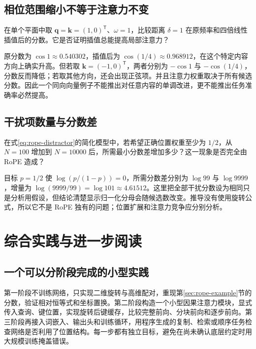 \documentclass[UTF8,12pt,a4paper,fontset=fandol]{ctexart}
\begin{document}
\subsection{相位范围缩小不等于注意力不变}
\begin{example}[插值对短距离的影响]
在单个平面中取 $\mathbf q=\mathbf k=(1,0)^{\mathsf T}$、$\omega=1$，比较距离 $\delta=1$ 在原频率和四倍线性插值后的分数。它是否证明插值总能提高局部注意力？
\end{example}
\begin{solve}
原分数为 $\cos1\approx0.540302$，插值后为 $\cos(1/4)\approx0.968912$，在这个特定内容方向上确实升高。但若取 $\mathbf k=(-1,0)^{\mathsf T}$，两者分别为 $-\cos1$ 与 $-\cos(1/4)$，分数反而降低；若取其他方向，还会出现正弦项。并且注意力权重取决于所有候选分数。因此一个同向向量例子不能推出对任意内容的单调改进，更不能推出任务准确率必然提高。
\end{solve}

\subsection{干扰项数量与分数差}
\begin{example}[扩窗后的权重稀释]
在式\eqref{eq:rope-distractor}的简化模型中，若希望正确位置权重至少为 $1/2$，从 $N=100$ 增加到 $N=10000$ 后，所需最小分数差增加多少？这一现象是否完全由 RoPE 造成？
\end{example}
\begin{solve}
目标 $p=1/2$ 使 $\log(p/(1-p))=0$，所需分数差分别为 $\log99$ 与 $\log9999$，增量为 $\log(9999/99)=\log101\approx4.61512$。这里把全部干扰分数设为相同只是分析用假设，但结论清楚显示归一化分母会随候选数改变。推导没有使用旋转公式，所以它不是 RoPE 独有的问题；位置扩展和注意力竞争应分别分析。
\end{solve}

\section{综合实践与进一步阅读}
\label{sec:rope-practice}

\subsection{一个可以分阶段完成的小型实践}
第一阶段不训练网络，只实现二维旋转与高维配对，重现第\ref{sec:rope-example}节的分数，验证相对恒等式和坐标置换。第二阶段构造一个小型因果注意力模块，显式传入查询、键位置，实现旋转后键缓存，比较完整前向、分块前向和逐步前向。第三阶段再接入词嵌入、输出头和训练循环，用程序生成的复制、检索或顺序任务检查网络是否利用了位置结构。每一步都有独立目标，避免在尚未确认底层约定时用大规模训练掩盖错误。
\end{document}
